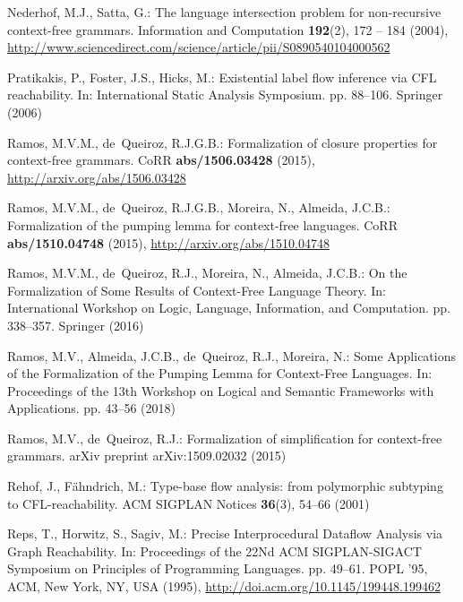 \documentclass[runningheads]{llncs}
\begin{document}
\begin{thebibliography}{10}
 Nederhof, M.J., Satta, G.: {The language intersection problem for non-recursive
   context-free grammars}. {Information and Computation}  \textbf{192}(2),  172
   -- 184 (2004),
   \url{http://www.sciencedirect.com/science/article/pii/S0890540104000562}

 Pratikakis, P., Foster, J.S., Hicks, M.: {Existential label flow inference via
   CFL reachability}. In: International Static Analysis Symposium. pp. 88--106.
   Springer (2006)

 Ramos, M.V.M., de~Queiroz, R.J.G.B.: {Formalization of closure properties for
   context-free grammars}. CoRR  \textbf{abs/1506.03428} (2015),
   \url{http://arxiv.org/abs/1506.03428}

 Ramos, M.V.M., de~Queiroz, R.J.G.B., Moreira, N., Almeida, J.C.B.:
   {Formalization of the pumping lemma for context-free languages}. CoRR
   \textbf{abs/1510.04748} (2015), \url{http://arxiv.org/abs/1510.04748}

 Ramos, M.V.M., de~Queiroz, R.J., Moreira, N., Almeida, J.C.B.: {On the
   Formalization of Some Results of Context-Free Language Theory}. In:
   International Workshop on Logic, Language, Information, and Computation. pp.
   338--357. Springer (2016)

 Ramos, M.V., Almeida, J.C.B., de~Queiroz, R.J., Moreira, N.: {Some Applications
   of the Formalization of the Pumping Lemma for Context-Free Languages}. In:
   Proceedings of the 13th Workshop on Logical and Semantic Frameworks with
   Applications. pp. 43--56 (2018)

 Ramos, M.V., de~Queiroz, R.J.: {Formalization of simplification for
   context-free grammars}. arXiv preprint arXiv:1509.02032  (2015)

 Rehof, J., F{\"a}hndrich, M.: {Type-base flow analysis: from polymorphic
   subtyping to CFL-reachability}. ACM SIGPLAN Notices  \textbf{36}(3),  54--66
   (2001)

 Reps, T., Horwitz, S., Sagiv, M.: {Precise Interprocedural Dataflow Analysis
   via Graph Reachability}. In: Proceedings of the 22Nd ACM SIGPLAN-SIGACT
   Symposium on Principles of Programming Languages. pp. 49--61. POPL '95, ACM,
   New York, NY, USA (1995), \url{http://doi.acm.org/10.1145/199448.199462}


\end{thebibliography}
\end{document}

